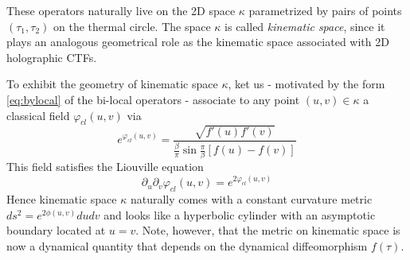 These operators naturally live on the 2D space $\kappa$ parametrized by pairs of points $(\tau_1,\tau_2)$ on the thermal circle. The space $\kappa$ is called \textit{kinematic space}, since it plays an analogous geometrical role as the kinematic space associated with 2D holographic CTFs.
\par 
To exhibit the geometry of kinematic space $\kappa$, ket us - motivated by the form \eqref{eq:bylocal} of the bi-local operators - associate to any point $(u,v)\in\kappa$ a classical field $\varphi_{cl}(u,v)$ via
\begin{equation}
e^{\varphi_{cl}(u,v)} = \frac{\sqrt{f'(u)f'(v)}}{\frac{\beta}{\pi}\sin\frac{\pi}{\beta}[f(u)-f(v)]}
\end{equation}
This field satisfies the Liouville equation
\begin{equation}
\partial_u\partial_v\varphi_{cl}(u,v) = e^{2\varphi_{cl}(u,v)}
\end{equation}
Hence kinematic space $\kappa$ naturally comes with a constant curvature metric $ds^2=e^{2\phi(u,v)}dudv$ and looks like a hyperbolic cylinder with an asymptotic boundary located at $u=v$. Note, however, that the metric on kinematic space is now a dynamical quantity that depends on the dynamical diffeomorphism $f(\tau)$.
